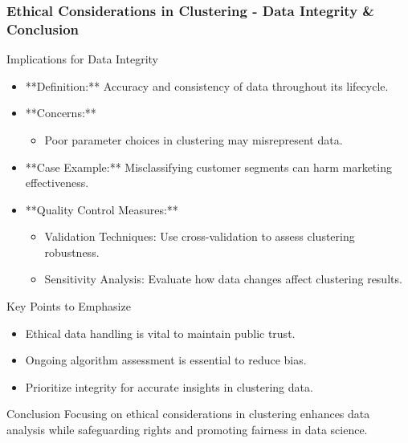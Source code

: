\documentclass[aspectratio=169]{beamer}
\begin{document}
\begin{frame}[fragile]
    \frametitle{Ethical Considerations in Clustering - Data Integrity & Conclusion}
    \begin{block}{Implications for Data Integrity}
        \begin{itemize}
            \item **Definition:** Accuracy and consistency of data throughout its lifecycle.
            \item **Concerns:**
                \begin{itemize}
                    \item Poor parameter choices in clustering may misrepresent data.
                \end{itemize}
            \item **Case Example:** Misclassifying customer segments can harm marketing effectiveness.
            \item **Quality Control Measures:**
                \begin{itemize}
                    \item Validation Techniques: Use cross-validation to assess clustering robustness.
                    \item Sensitivity Analysis: Evaluate how data changes affect clustering results.
                \end{itemize}
        \end{itemize}
    \end{block}
    
    \begin{block}{Key Points to Emphasize}
        \begin{itemize}
            \item Ethical data handling is vital to maintain public trust.
            \item Ongoing algorithm assessment is essential to reduce bias.
            \item Prioritize integrity for accurate insights in clustering data.
        \end{itemize}
    \end{block}
    
    \begin{block}{Conclusion}
        Focusing on ethical considerations in clustering enhances data analysis while safeguarding rights and promoting fairness in data science.
    \end{block}
\end{frame}
\end{document}
